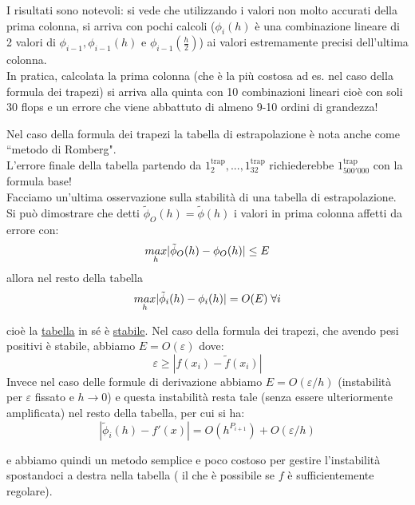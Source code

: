 I risultati sono notevoli: si vede che utilizzando i valori non molto accurati della prima colonna, si arriva con pochi calcoli ($\phi_i(h)$ è una combinazione lineare di 2 valori di $\phi_{i-1},\phi_{i-1}(h)$ e $\phi_{i-1}(\frac{h}{2})$) ai valori estremamente precisi dell'ultima colonna.\\In pratica, calcolata la prima colonna (che è la più costosa ad es. nel caso della formula dei trapezi) si arriva alla quinta con 10 combinazioni lineari cioè con soli 30 flops e un errore che viene abbattuto di almeno 9-10 ordini di grandezza!

Nel caso della formula dei trapezi la tabella di estrapolazione è nota anche come ``metodo di Romberg".\\
L'errore finale della tabella partendo da $1_2^{\text{trap}},...,1_{32}^{\text{trap}}$ richiederebbe $1_{500'000}^{\text{trap}}$ con la formula base!\\
Facciamo un'ultima osservazione sulla stabilità di una tabella di estrapolazione.\\
Si può dimostrare che detti $\tilde{\phi}_O(h)=\tilde{\phi}(h)$ i valori in prima colonna affetti da errore con:
\begin{equation*}
    \underset{h}{max} \lvert\tilde{\phi}_O(h)-\phi_O(h)\rvert \leq E
\end{equation*}
allora nel resto della tabella 
\begin{equation*}
    \underset{h}{max} \lvert\tilde{\phi}_i(h)-\phi_i(h)\rvert = O(E) \; \forall i 
\end{equation*}

cioè la \uline{tabella} in sé è \uline{stabile}.
Nel caso della formula dei trapezi, che avendo pesi positivi è stabile, abbiamo $E=O(\varepsilon)$ dove:
\begin{equation*}
    \varepsilon \geq |f(x_i)-\tilde{f}(x_i)|
\end{equation*}
Invece nel caso delle formule di derivazione abbiamo $E=O(\varepsilon/h)$ (instabilità per $\varepsilon$ fissato e $h\rightarrow 0$) e questa instabilità resta tale (senza essere ulteriormente amplificata) nel resto della tabella, per cui si ha:
\begin{equation*}
    |\tilde{\phi}_i(h)-f'(x)|=O(h^{P_{i+1}})+O(\varepsilon/h)
\end{equation*}

e abbiamo quindi un metodo semplice e poco costoso per gestire l'instabilità spostandoci a destra nella tabella ( il che è possibile se $f$ è sufficientemente regolare).
\newpage